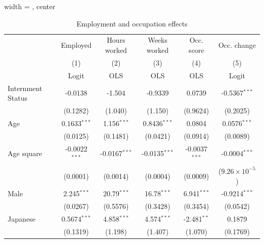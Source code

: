 \begin{table}[htbp]
   \caption{\label{tbl:reg2} Employment and occupation effects}
   \begin{adjustbox}{width = \textwidth, center}
      \begin{tabular}{lccccc}
         \toprule
                               & Employed        & Hours worked    & Weeks worked    & Occ. score      & Occ. change\\  
                               & (1)             & (2)             & (3)             & (4)             & (5)\\  
                               &  Logit          & OLS             & OLS             & OLS             & Logit\\  
         \midrule 
         Internment Status     & -0.0138         & -1.504          & -0.9339         & 0.0739          & -0.5367$^{***}$\\   
                               & (0.1282)        & (1.040)         & (1.150)         & (0.9624)        & (0.2025)\\   
         Age                   & 0.1633$^{***}$  & 1.156$^{***}$   & 0.8436$^{***}$  & 0.0804          & 0.0576$^{***}$\\   
                               & (0.0125)        & (0.1481)        & (0.0421)        & (0.0914)        & (0.0089)\\   
         Age square            & -0.0022$^{***}$ & -0.0167$^{***}$ & -0.0135$^{***}$ & -0.0037$^{***}$ & -0.0004$^{***}$\\   
                               & (0.0001)        & (0.0014)        & (0.0004)        & (0.0009)        & ($9.26\times 10^{-5}$)\\    
         Male                  & 2.245$^{***}$   & 20.79$^{***}$   & 16.78$^{***}$   & 6.941$^{***}$   & -0.9214$^{***}$\\   
                               & (0.0267)        & (0.5576)        & (0.3428)        & (0.3454)        & (0.0542)\\   
         Japanese              & 0.5674$^{***}$  & 4.858$^{***}$   & 4.574$^{***}$   & -2.481$^{**}$   & 0.1879\\   
                               & (0.1319)        & (1.198)         & (1.407)         & (1.070)         & (0.1769)\\   

\end{tabular}
\end{adjustbox}
\end{table}
